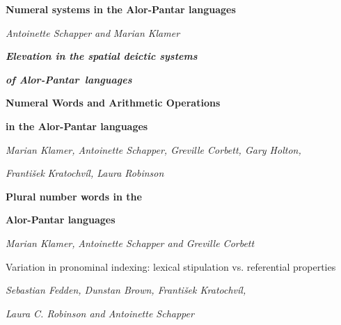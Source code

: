 \documentclass[a4paper]{article}
\begin{document}
{\centering
\textbf{Numeral systems in the Alor-Pantar languages}
\par}

{\centering
\textit{Antoinette Schapper }\textit{and}\textit{ Marian Klamer}
\par}

\setcounter{tocdepth}{3}
\renewcommand\contentsname{}
\tableofcontents
{}

{\centering
\emph{\textbf{Elevation in the spatial deictic systems}}
\par}

{\centering
\emph{\textbf{of Alor-Pantar~languages}}
\par}

\setcounter{tocdepth}{3}
\renewcommand\contentsname{}
\tableofcontents
{}

{\centering
\textbf{Numeral Words and Arithmetic Operations }
\par}

{\centering
\textbf{in the Alor-Pantar languages }
\par}

{\centering
\emph{Marian Klamer, Antoinette Schapper, Greville Corbett, Gary Holton, }
\par}

{\centering
\emph{Franti}\emph{\v{s}ek}\emph{ Kratochv\'il, Laura Robinson}
\par}

\setcounter{tocdepth}{3}
\renewcommand\contentsname{}
\tableofcontents
{}

{\centering
\textbf{Plural number words in the }
\par}

{\centering
\textbf{Alor-Pantar languages}
\par}

{\centering
\textit{Marian Klamer}\textit{, }\textit{Antoinette Schapper and Greville Corbett}
\par}

\setcounter{tocdepth}{3}
\renewcommand\contentsname{}
\tableofcontents
{}

{\centering
Variation in pronominal indexing: lexical stipulation vs. referential properties
\par}

{\centering
\textit{Sebastian Fedden, Dunstan Brown, Franti\v{s}ek Kratochv\'il, }
\par}

{\centering
\textit{Laura C. Robinson and Antoinette Schapper}
\par}

\setcounter{tocdepth}{3}
\renewcommand\contentsname{}
\tableofcontents
\end{document}
